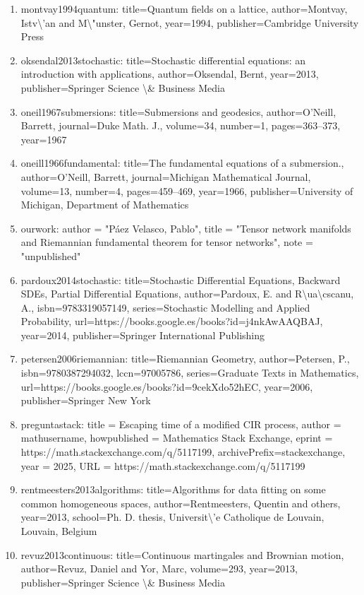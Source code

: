 \documentclass[11pt]{article}
\begin{document}
\begin{enumerate}[leftmargin=*]
  \item montvay1994quantum: title=Quantum fields on a lattice, author=Montvay, Istv\textbackslash{}'an and M\textbackslash{}"unster, Gernot, year=1994, publisher=Cambridge University Press
  \item oksendal2013stochastic: title=Stochastic differential equations: an introduction with applications, author=Oksendal, Bernt, year=2013, publisher=Springer Science \textbackslash{}\& Business Media
  \item oneil1967submersions: title=Submersions and geodesics, author=O’Neill, Barrett, journal=Duke Math. J., volume=34, number=1, pages=363--373, year=1967
  \item oneill1966fundamental: title=The fundamental equations of a submersion., author=O'Neill, Barrett, journal=Michigan Mathematical Journal, volume=13, number=4, pages=459--469, year=1966, publisher=University of Michigan, Department of Mathematics
  \item ourwork: author = "Páez Velasco, Pablo", title = "Tensor network manifolds and Riemannian fundamental theorem for tensor networks", note = "unpublished"
  \item pardoux2014stochastic: title=Stochastic Differential Equations, Backward SDEs, Partial Differential Equations, author=Pardoux, E. and R\textbackslash{}ua\textbackslash{}cscanu, A., isbn=9783319057149, series=Stochastic Modelling and Applied Probability, url=https://books.google.es/books?id=j4nkAwAAQBAJ, year=2014, publisher=Springer International Publishing
  \item petersen2006riemannian: title=Riemannian Geometry, author=Petersen, P., isbn=9780387294032, lccn=97005786, series=Graduate Texts in Mathematics, url=https://books.google.es/books?id=9cekXdo52hEC, year=2006, publisher=Springer New York
  \item preguntastack: title = Escaping time of a modified CIR process, author = mathusername, howpublished = Mathematics Stack Exchange, eprint = https://math.stackexchange.com/q/5117199, archivePrefix=stackexchange, year = 2025, URL = https://math.stackexchange.com/q/5117199
  \item rentmeesters2013algorithms: title=Algorithms for data fitting on some common homogeneous spaces, author=Rentmeesters, Quentin and others, year=2013, school=Ph. D. thesis, Universit\textbackslash{}'e Catholique de Louvain, Louvain, Belgium
  \item revuz2013continuous: title=Continuous martingales and Brownian motion, author=Revuz, Daniel and Yor, Marc, volume=293, year=2013, publisher=Springer Science \textbackslash{}\& Business Media

\end{enumerate}
\end{document}
